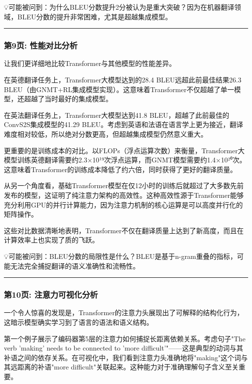 \documentclass[11pt,a4paper]{article}
\begin{document}
💡可能被问到：为什么BLEU分数提升2分被认为是重大突破？因为在机器翻译领域，BLEU分数的提升非常困难，尤其是超越集成模型。

\vspace{0.5em}\noindent\rule{\textwidth}{0.4pt}\vspace{0.5em}

\subsubsection*{第9页: 性能对比分析}

让我们更详细地比较Transformer与其他模型的性能差异。

在英德翻译任务上，Transformer大模型达到的28.4 BLEU远超此前最佳结果26.3 BLEU（由GNMT+RL集成模型实现）。这意味着Transformer不仅超越了单一模型，还超越了当时最好的集成模型。

在英法翻译任务上，Transformer大模型达到41.8 BLEU，超越了此前最佳的ConvS2S集成模型的41.29 BLEU。考虑到英语和法语在语言学上更为接近，翻译难度相对较低，所以绝对分数更高，但超越集成模型仍然意义重大。

更重要的是训练成本的对比。以FLOPs（浮点运算次数）来衡量，Transformer大模型训练英德翻译需要约2.3×10¹⁹次浮点运算，而GNMT模型需要约1.4×10²⁰次。这意味着Transformer的训练成本降低了约六倍，同时获得了更好的翻译质量。

从另一个角度看，基础Transformer模型在仅12小时的训练后就超过了大多数先前发布的模型，这证明了纯注意力架构的高效性。这种高效性源于Transformer能够充分利用GPU的并行计算能力，因为注意力机制的核心运算是可以高度并行化的矩阵操作。

这些对比数据清晰地表明，Transformer不仅在翻译质量上达到了新高度，而且在计算效率上也实现了质的飞跃。

💡可能被问到：BLEU分数的局限性是什么？BLEU是基于n-gram重叠的指标，可能无法完全捕捉翻译的语义准确性和流畅性。

\vspace{0.5em}\noindent\rule{\textwidth}{0.4pt}\vspace{0.5em}

\subsubsection*{第10页: 注意力可视化分析}

一个令人惊喜的发现是，Transformer的注意力头展现出了可解释的结构化行为，这暗示模型确实学习到了语言的语法和语义结构。

第一个例子展示了编码器第5层的注意力如何捕捉长距离依赖关系。考虑句子"The verb 'making' needs to be connected to 'more difficult'"——这是典型的动词与其补语之间的依存关系。在可视化中，我们看到注意力头准确地将"making"这个词与其远距离的补语"more difficult"关联起来。这种能力对于准确理解句子含义至关重要。
\end{document}
